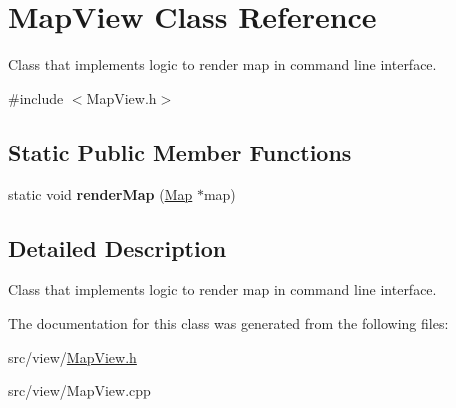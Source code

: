 \hypertarget{classMapView}{}\section{Map\+View Class Reference}
\label{classMapView}


Class that implements logic to render map in command line interface.  




{\ttfamily \#include $<$Map\+View.\+h$>$}

\subsection*{Static Public Member Functions}
\begin{DoxyCompactItemize}
\item 
\hypertarget{classMapView_a6720017b6fc3902cf03ec6df87f363cd}{}\label{classMapView_a6720017b6fc3902cf03ec6df87f363cd} 
static void {\bfseries render\+Map} (\hyperlink{classMap}{Map} $\ast$map)
\end{DoxyCompactItemize}


\subsection{Detailed Description}
Class that implements logic to render map in command line interface. 

The documentation for this class was generated from the following files\+:\begin{DoxyCompactItemize}
\item 
src/view/\hyperlink{MapView_8h}{Map\+View.\+h}\item 
src/view/Map\+View.\+cpp\end{DoxyCompactItemize}
